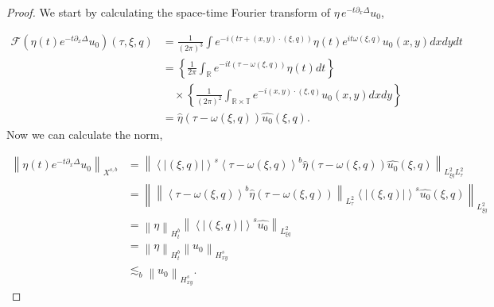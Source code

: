 \documentclass[10pt,a4paper]{amsart}
\newcommand{\F}{\mathcal{F}}
\newcommand{\Fh}[1]{\widehat{#1}}
\newcommand{\Lptxy}[3]{%
    \left\lVert #1\right\rVert_{L^{#2}_{#3}}%
}
\def\R{{\mathbb R}}
\def\T{{\mathbb T}}
\newcommand{\brs}[1]{%
    \left\{#1\right\}
}
\newcommand{\inp}[1]{%
    \left\langle #1\right\rangle
}
\newcommand{\norm}[1]{%
    \left\lVert #1\right\rVert%
}
\newcommand{\sg}[1]{%
    e^{#1\partial_x\Delta}%
}
\newcommand{\xnorm}[3]{%
    \left\lVert #1\right\rVert_{X^{{#2},{#3}}}%
}
\begin{document}
\begin{proof}
    We start by calculating the space-time Fourier transform of $\eta\, \sg{-t} u_0$, 


    \begin{align*}
        \F {\left({\eta(t) \sg{-t} u_0}\right)}(\tau, \xi,q) &= \frac{1}{(2\pi)^3} \int e^{- i (t \tau + (x,y) \cdot (\xi,q))} \eta(t) e^{i t \omega(\xi,q)} u_0(x,y) dx dy dt\\
        & = \brs{ \frac{1}{2\pi} \int_\R e^{- i t (\tau - \omega(\xi,q))} \eta(t) dt}\\
        &\quad \times \brs{\frac{1}{(2 \pi)^2} \int_{\R \times \T} e^{- i (x,y)\cdot (\xi,q)} u_0(x,y) dx dy }\\
        &= \Fh{\eta} (\tau - \omega(\xi,q)) \Fh{u_0}(\xi,q).
    \end{align*}
Now we can calculate the norm,

\begin{align*}
    \xnorm{\eta(t) \sg{-t} {u_0}}{s}{b} &= \norm{\inp{|(\xi,q)|}^s \inp{\tau - \omega(\xi,q)}^b \Fh{\eta}(\tau -\omega(\xi,q)) \Fh{u_0}(\xi,q)}_{L_{\xi q}^2 L^2_\tau}\\
    &= \Lptxy{  \Lptxy{\inp{\tau -\omega(\xi,q)}^b \Fh{\eta}(\tau - \omega(\xi,q))}{2}{\tau} \inp{|(\xi,q)|}^s \Fh{u_0}(\xi,q)  }{2}{\xi q}\\
    &= \norm{\eta}_{H^b_t} \norm{\inp{|(\xi,q)|}^s \Fh{u_0}}_{L^2_{\xi q}}\\
    &= \norm{\eta}_{H^b_t} \norm{u_0}_{H^{s}_{xy}}\\
    & \lesssim_b \norm{u_0}_{H^{s}_{xy}}.
\end{align*}




    
\end{proof}
\end{document}
